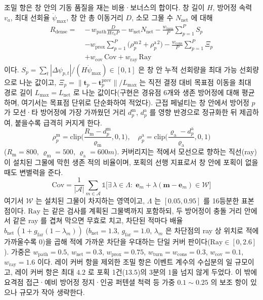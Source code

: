 조밀 항은 창 안의 기동 품질을 재는 비용·보너스의 합이다. 창 길이 $H$, 방어정 속력 $v_a$,
최대 선회율 $\dot\psi_{\max}$, 창 안 총 이동거리 $D$, 소모 그물 수 $N_{\mathrm{net}}$ 에 대해
\begin{equation}
\begin{aligned}
R_\mathrm{dense} = \;& -\,w_{\mathrm{path}} \frac{D}{H v_a P} - w_{\mathrm{net}} N_{\mathrm{net}}
  - \frac{w_{\mathrm{turn}}}{P}\sum_{p=1}^{P} S_p\\
  & - w_{\mathrm{prox}} \sum_{p=1}^{P}\big(\rho_{p}^{\mathrm{m}\,2} + \rho_{p}^{\mathrm{a}\,2}\big)
  - \frac{w_{\mathrm{cons}}}{P}\sum_{p=1}^{P} \Xi_p\\
  & + w_{\mathrm{cov}}\, \mathrm{Cov} + w_{\mathrm{ray}}\, \mathrm{Ray}
\end{aligned}
\label{eq:rdense}
\end{equation}
이다. $S_p = \sum_t |\Delta\psi_{p,t}| / (H \dot\psi_{\max}) \in [0,1]$ 은 창 안 누적 선회량을
최대 가능 선회량으로 나눈 값이고, $\Xi_p = \lVert \mathbf{t}_p - \mathbf{t}^{\mathrm{prev}}_p \rVert / L_{\max}$
는 직전 결정 대비 목표점 이동을 최대 경로 길이 $L_{\max} = L_{\mathrm{net}}$ 로 나눈 값이다(구현은
경유점 6개와 생존 방어정에 대해 평균하며, 여기서는 목표점 단위로 단순화하여 적었다). 근접 페널티는 창 안에서
방어정 $p$ 가 모선·타 방어정에 가장 가까웠던 거리
$d^{\mathrm{m}}_p$, $d^{\mathrm{a}}_p$ 를 영향 반경으로 정규화한 뒤 제곱하여, 붙을수록
급격히 커지게 한다.
\begin{equation}
\rho^{\mathrm{m}}_p = \mathrm{clip}\!\Big(\frac{R_{\mathrm{m}} - d^{\mathrm{m}}_p}{\varrho_{\mathrm{m}}}, 0, 1\Big), \quad
\rho^{\mathrm{a}}_p = \mathrm{clip}\!\Big(\frac{\varrho_{\mathrm{a}} - d^{\mathrm{a}}_p}{\varrho_{\mathrm{a}}}, 0, 1\Big)
\label{eq:prox}
\end{equation}
($R_{\mathrm{m}} = 800$, $\varrho_{\mathrm{m}} = 500$, $\varrho_{\mathrm{a}} = 600\unit{m}$).
커버리지는 적에서 모선으로 향하는 직선(ray)이 설치된 그물에 막힌 생존 적의 비율이며,
포획의 선행 지표로서 창 안에 포획이 없을 때도 변별력을 준다.
\begin{equation}
\mathrm{Cov} = \frac{1}{|\mathcal{A}|} \sum_{m \in \mathcal{A}}
  \mathbb{1}\big[\exists\, \lambda \in \Lambda :\; \mathbf{e}_m + \lambda(\mathbf{m} - \mathbf{e}_m) \in \mathcal{W}\big]
\label{eq:coverage}
\end{equation}
여기서 $\mathcal{W}$ 는 설치된 그물이 차지하는 영역이고, $\Lambda$ 는 $[0.05, 0.95]$ 를
16등분한 표본점이다. $\mathrm{Ray}$ 는 같은 검사를 계획된 그물벽까지 포함하되, 두 방어정이 충돌 거리 안에서
같은 ray 를 겹쳐 막으면 무효로 치고, 차단된 적마다 배율
$b_{\mathrm{net}}\,(1 + g_{\mathrm{far}}(1 - \lambda_m))$ ($b_{\mathrm{net}} = 1.3$,
$g_{\mathrm{far}} = 1.0$, $\lambda_m$ 은 차단점의 ray 상 위치로 적에 가까울수록 0)을 곱해
적에 가까운 차단을 우대하는 단일 커버 판이다($\mathrm{Ray} \in [0, 2.6]$). 가중은 $w_{\mathrm{path}} = 0.5$,
$w_{\mathrm{net}} = 0.3$, $w_{\mathrm{prox}} = 0.75$, $w_{\mathrm{turn}} = w_{\mathrm{cons}} = 0.3$,
$w_{\mathrm{cov}} = 0.1$, $w_{\mathrm{ray}} = 1.6$ 이다. 레이 커버 항을 제외한 조밀 항은 이벤트
계수의 수십분의 일 규모이고, 레이 커버 항은 최대 $4.2$ 로 포획 1건($13.5$)의 3분의 1을 넘지
않게 두었다. 이 밖에 요격점 접근·예비 방어정 정지·인공 퍼텐셜
척력 등 가중 $0.1\sim0.25$ 의 보조 항이 있으나 규모가 작아 생략한다.

